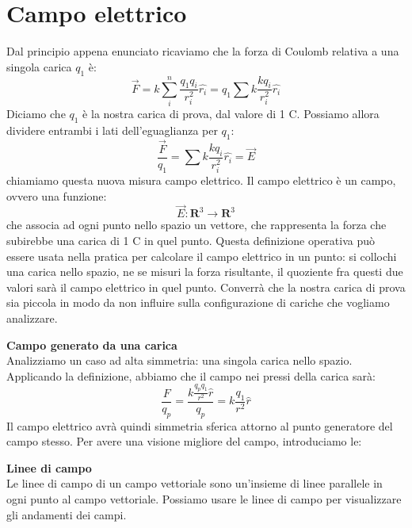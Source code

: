 \documentclass[a4paper,12pt]{article}
\begin{document}
\section{Campo elettrico}
Dal principio appena enunciato ricaviamo che la forza di Coulomb relativa a una singola carica $q_1$ è:
$$ \vec{F} = k \sum_i^n\frac{q_1 q_i}{r_i^2}\hat{r_i} = q_1 \sum k\frac{kq_i}{r_i^2}\hat{r_i} $$
Diciamo che $q_1$ è la nostra carica di prova, dal valore di 1 C. Possiamo allora dividere entrambi i lati dell'eguaglianza per $q_1$:
$$ \frac{\vec{F}}{q_1} = \sum k\frac{kq_i}{r_i^2}\hat{r_i} = \vec{E}$$
chiamiamo questa nuova misura campo elettrico. Il campo elettrico è un campo, ovvero una funzione:
$$ \vec{E}: \mathbf{R}^3 \rightarrow \mathbf{R}^3 $$
che associa ad ogni punto nello spazio un vettore, che rappresenta la forza che subirebbe una carica di 1 C in quel punto. Questa definizione
operativa può essere usata nella pratica per calcolare il campo elettrico in un punto: si collochi una carica nello spazio, ne se misuri la forza risultante,
il quoziente fra questi due valori sarà il campo elettrico in quel punto. Converrà che la nostra carica di prova sia piccola in modo
da non influire sulla configurazione di cariche che vogliamo analizzare.
\par\smallskip
\textbf{Campo generato da una carica} \\
Analizziamo un caso ad alta simmetria: una singola carica nello spazio. Applicando la definizione, abbiamo che il campo nei pressi
della carica sarà:
$$ \frac{F}{q_p} = \frac{k \frac{q_p q_1}{r^2}\hat{r}}{q_p} = k \frac{q_1}{r^2}\hat{r}$$
Il campo elettrico avrà quindi simmetria sferica attorno al punto generatore del campo stesso. Per avere una visione
migliore del campo, introduciamo le:
\par\smallskip
\textbf{Linee di campo} \\
Le linee di campo di un campo vettoriale sono un'insieme di linee parallele in ogni punto al campo vettoriale. Possiamo usare le linee
di campo per visualizzare gli andamenti dei campi.
\end{document}
